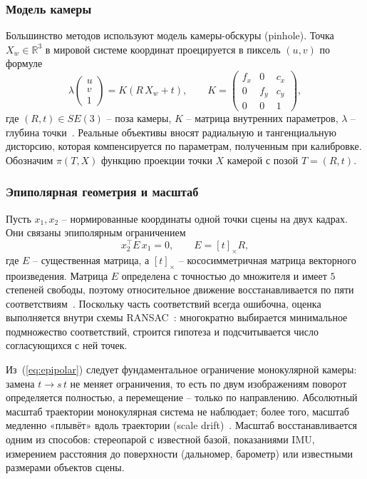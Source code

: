     \subsubsection{Модель камеры}
    Большинство методов используют модель камеры-обскуры (pinhole).
    Точка $X_w \in \mathbb{R}^3$ в мировой системе координат проецируется в пиксель $(u, v)$ по формуле
    \begin{equation}\label{eq:pinhole}
        \lambda \begin{pmatrix} u \\ v \\ 1 \end{pmatrix} = K \left( R\, X_w + t \right), \qquad
        K = \begin{pmatrix} f_x & 0 & c_x \\ 0 & f_y & c_y \\ 0 & 0 & 1 \end{pmatrix},
    \end{equation}
    где $(R, t) \in SE(3)$ -- поза камеры, $K$ -- матрица внутренних параметров, $\lambda$ -- глубина точки~\cite{hartley_zisserman}.
    Реальные объективы вносят радиальную и тангенциальную дисторсию, которая компенсируется по параметрам, полученным при калибровке.
    Обозначим $\pi(T, X)$ функцию проекции точки $X$ камерой с позой $T = (R, t)$.

    \subsubsection{Эпиполярная геометрия и масштаб}
    Пусть $x_1, x_2$ -- нормированные координаты одной точки сцены на двух кадрах.
    Они связаны эпиполярным ограничением
    \begin{equation}\label{eq:epipolar}
        x_2^\top E\, x_1 = 0, \qquad E = [t]_\times R ,
    \end{equation}
    где $E$ -- существенная матрица, а $[t]_\times$ -- кососимметричная матрица векторного произведения.
    Матрица $E$ определена с точностью до множителя и имеет $5$ степеней свободы, поэтому относительное движение восстанавливается по пяти соответствиям~\cite{five_point}.
    Поскольку часть соответствий всегда ошибочна, оценка выполняется внутри схемы RANSAC~\cite{ransac}: многократно выбирается минимальное подмножество соответствий, строится гипотеза и подсчитывается число согласующихся с ней точек.

    Из~(\ref{eq:epipolar}) следует фундаментальное ограничение монокулярной камеры: замена $t \to s\,t$ не меняет ограничения, то есть по двум изображениям поворот определяется полностью, а перемещение -- только по направлению.
    Абсолютный масштаб траектории монокулярная система не наблюдает; более того, масштаб медленно «плывёт» вдоль траектории (scale drift)~\cite{vo_tutorial1}.
    Масштаб восстанавливается одним из способов: стереопарой с известной базой, показаниями IMU, измерением расстояния до поверхности (дальномер, барометр) или известными размерами объектов сцены.

